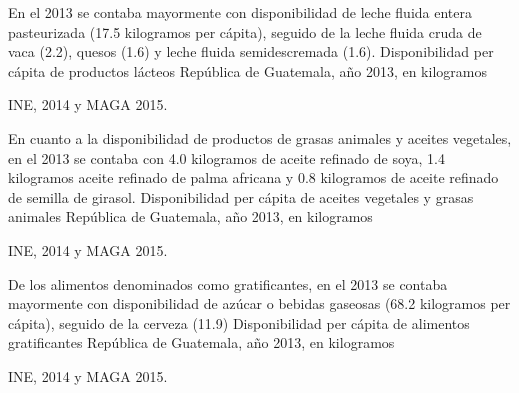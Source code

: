 
%
{%
En el 2013 se contaba mayormente con disponibilidad de leche fluida entera pasteurizada (17.5 kilogramos per cápita), seguido de la leche fluida cruda de vaca (2.2), quesos (1.6) y leche fluida semidescremada (1.6).}%
{%
	Disponibilidad per cápita de productos lácteos} %
{%
	República de Guatemala, año 2013, en kilogramos } %
{%
	\begin{tikzpicture}[x=1pt,y=1pt]    \end{tikzpicture}}%
{%
	INE, 2014 y MAGA 2015.} %



%
{%
En cuanto a la disponibilidad de productos de grasas animales y aceites vegetales, en el 2013 se contaba con 4.0 kilogramos de aceite refinado de soya, 1.4 kilogramos aceite refinado de palma africana y 0.8 kilogramos de aceite refinado de semilla de girasol.}%
{%
	Disponibilidad per cápita de aceites vegetales y grasas animales} %
{%
	República de Guatemala, año 2013, en kilogramos } %
{%
	\begin{tikzpicture}[x=1pt,y=1pt]    \end{tikzpicture}}%
{%
	INE, 2014 y MAGA 2015.} %


%
{%
De los alimentos denominados como gratificantes, en el 2013 se contaba mayormente con disponibilidad de azúcar o bebidas gaseosas (68.2 kilogramos per cápita), seguido de la cerveza (11.9)}%
{%
	Disponibilidad per cápita de alimentos gratificantes} %
{%
	República de Guatemala, año 2013, en kilogramos } %
{%
	\begin{tikzpicture}[x=1pt,y=1pt]    \end{tikzpicture}}%
{%
	INE, 2014 y MAGA 2015.} %